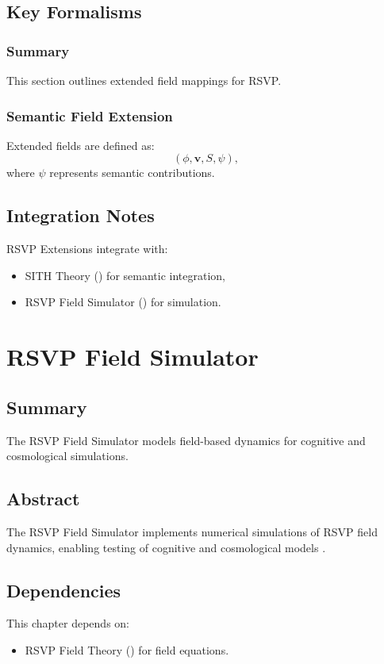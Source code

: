 \documentclass[11pt,oneside]{memoir}
\theoremstyle{plain}
\begin{document}
\section{Key Formalisms}
\subsection{Summary}
This section outlines extended field mappings for RSVP.

\subsection{Semantic Field Extension}
Extended fields are defined as:
\begin{equation}
    (\phi, \mathbf{v}, S, \psi),
\end{equation}
where \(\psi\) represents semantic contributions.

\section{Integration Notes}
RSVP Extensions integrate with:
\begin{itemize}
    \item SITH Theory () for semantic integration,
    \item RSVP Field Simulator () for simulation.
\end{itemize}

\chapter{RSVP Field Simulator}
\label{sec:rsvp_simulator}

\section{Summary}
The RSVP Field Simulator models field-based dynamics for cognitive and cosmological simulations.

\section{Abstract}
The RSVP Field Simulator implements numerical simulations of RSVP field dynamics, enabling testing of cognitive and cosmological models \cite{evans}.

\section{Dependencies}
This chapter depends on:
\begin{itemize}
    \item RSVP Field Theory () for field equations.
\end{itemize}
\end{document}
